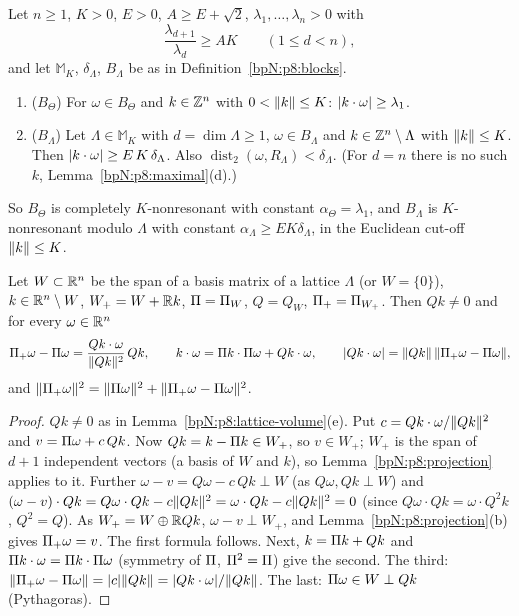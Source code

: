 \begin{lemma}\label{bpN:p8:geometric}
Let $n\ge1$, $K>0$, $E>0$, $A\ge E+\sqrt2$, $\lambda_1,\dots,\lambda_n>0$ with
\[\frac{\lambda_{d+1}}{\lambda_d}\ge AK\qquad(1\le d<n),\]
and let $\mathbb M_K$, $\delta_\Lambda$, $B_\Lambda$ be as in Definition~\ref{bpN:p8:blocks}.
\begin{enumerate}[label=(\alph*)]
\item ($B_\Theta$) For $\omega\in B_\Theta$ and $k\in\mathbb{Z}^n$ with $0<\lVert k\rVert\le K$: $\lvert k\cdot\omega\rvert\ge\lambda_1$.
\item ($B_\Lambda$) Let $\Lambda\in\mathbb M_K$ with $d=\dim\Lambda\ge1$, $\omega\in B_\Lambda$ and $k\in\mathbb{Z}^n\setminus\Lambda$ with $\lVert k\rVert\le K$. Then $\lvert k\cdot\omega\rvert\ge E\,K\,\delta_\Lambda$. Also $\operatorname{dist}_2(\omega,R_\Lambda)<\delta_\Lambda$. (For $d=n$ there is no such $k$, Lemma~\ref{bpN:p8:maximal}(d).)
\end{enumerate}
So $B_\Theta$ is completely $K$-nonresonant with constant $\alpha_\Theta=\lambda_1$, and $B_\Lambda$ is $K$-nonresonant modulo $\Lambda$ with constant $\alpha_\Lambda\ge EK\delta_\Lambda$, in the Euclidean cut-off $\lVert k\rVert\le K$.
\end{lemma}

\begin{lemma}\label{bpN:p8:geom-formula}
Let $W\subset\mathbb{R}^n$ be the span of a basis matrix of a lattice $\Lambda$ (or $W=\{0\}$), $k\in\mathbb{R}^n\setminus W$, $W_+=W+\mathbb{R} k$, $\Pi=\Pi_W$, $Q=Q_W$, $\Pi_+=\Pi_{W_+}$. Then $Qk\ne0$ and for every $\omega\in\mathbb{R}^n$
\[\Pi_+\omega-\Pi\omega=\frac{Qk\cdot\omega}{\lVert Qk\rVert^2}\,Qk,\qquad k\cdot\omega=\Pi k\cdot\Pi\omega+Qk\cdot\omega,\qquad\lvert Qk\cdot\omega\rvert=\lVert Qk\rVert\,\lVert \Pi_+\omega-\Pi\omega\rVert,\]
and $\lVert \Pi_+\omega\rVert^2=\lVert \Pi\omega\rVert^2+\lVert \Pi_+\omega-\Pi\omega\rVert^2$.
\end{lemma}
\begin{proof}
$Qk\ne0$ as in Lemma~\ref{bpN:p8:lattice-volume}(e). Put $c=Qk\cdot\omega/\lVert Qk\rVert^2$ and $v=\Pi\omega+c\,Qk$. Now $Qk=k-\Pi k\in W_+$, so $v\in W_+$; $W_+$ is the span of $d+1$ independent vectors (a basis of $W$ and $k$), so Lemma~\ref{bpN:p8:projection} applies to it. Further $\omega-v=Q\omega-c\,Qk\perp W$ (as $Q\omega,Qk\perp W$) and $(\omega-v)\cdot Qk=Q\omega\cdot Qk-c\lVert Qk\rVert^2=\omega\cdot Qk-c\lVert Qk\rVert^2=0$ (since $Q\omega\cdot Qk=\omega\cdot Q^2k$, $Q^2=Q$). As $W_+=W\oplus\mathbb{R} Qk$, $\omega-v\perp W_+$, and Lemma~\ref{bpN:p8:projection}(b) gives $\Pi_+\omega=v$. The first formula follows. Next, $k=\Pi k+Qk$ and $\Pi k\cdot\omega=\Pi k\cdot\Pi\omega$ (symmetry of $\Pi$, $\Pi^2=\Pi$) give the second. The third: $\lVert \Pi_+\omega-\Pi\omega\rVert=\lvert c\rvert\lVert Qk\rVert=\lvert Qk\cdot\omega\rvert/\lVert Qk\rVert$. The last: $\Pi\omega\in W\perp Qk$ (Pythagoras).
\end{proof}

